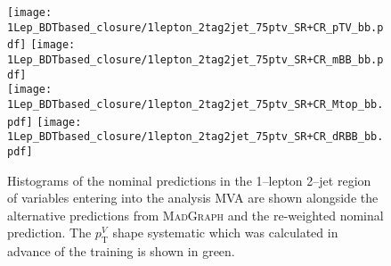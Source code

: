 \begin{figure}[ht!]
  \centering
  \texttt{[image: 1Lep\_BDTbased\_closure/1lepton\_2tag2jet\_75ptv\_SR+CR\_pTV\_bb.pdf]}
  \texttt{[image: 1Lep\_BDTbased\_closure/1lepton\_2tag2jet\_75ptv\_SR+CR\_mBB\_bb.pdf]}  \\
  \texttt{[image: 1Lep\_BDTbased\_closure/1lepton\_2tag2jet\_75ptv\_SR+CR\_Mtop\_bb.pdf]}
  \texttt{[image: 1Lep\_BDTbased\_closure/1lepton\_2tag2jet\_75ptv\_SR+CR\_dRBB\_bb.pdf]} \\
  \caption[Nominal, alternative and re-weighted nominal predictions of $W+$jets
  events (1--lepton channel, 2--jet category, MVA input variables).]{Histograms
    of the nominal predictions in the 1--lepton 2--jet region of variables
    entering into the analysis MVA are shown alongside the alternative
    predictions from \textsc{MadGraph} and the re-weighted nominal prediction.
    The $p_{\mathrm{T}}^V$ shape systematic which was calculated in advance of the training
    is shown in green.}
  \label{fig:wjets_1lep_2jet_BDTrClosure_1}
\end{figure}